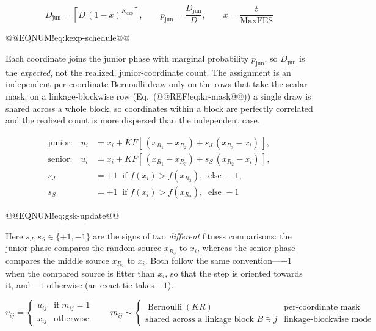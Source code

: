 \documentclass[10pt,a4paper]{article}
\begin{document}
\[
D_{\text{jun}} = \left\lceil D\,(1-x)^{K_{\exp}} \right\rceil,
\qquad p_{\text{jun}} = \frac{D_{\text{jun}}}{D},
\qquad x = \frac{t}{\text{MaxFES}}
\]

@@EQNUM!eq:kexp-schedule@@

Each coordinate joins the junior phase with marginal probability $p_{\text{jun}}$, so $D_{\text{jun}}$ is the \emph{expected}, not the realized, junior-coordinate count. The assignment is an independent per-coordinate Bernoulli draw only on the rows that take the scalar mask; on a linkage-blockwise row (Eq.~(@@REF!eq:kr-mask@@)) a single draw is shared across a whole block, so coordinates within a block are perfectly correlated and the realized count is more dispersed than the independent case.













\[
\begin{aligned}
\text{junior:}\quad u_i &= x_i + KF\left[\, (x_{R_1} - x_{R_2}) + s_J\,(x_{R_3} - x_i) \,\right],\\[2pt]
\text{senior:}\quad u_i &= x_i + KF\left[\, (x_{R_1} - x_{R_3}) + s_S\,(x_{R_2} - x_i) \,\right],\\[4pt]
s_J &= +1 \ \text{ if } f(x_i) > f(x_{R_3}), \ \text{ else } -1,\\[2pt]
s_S &= +1 \ \text{ if } f(x_i) > f(x_{R_2}), \ \text{ else } -1
\end{aligned}
\]

@@EQNUM!eq:gsk-update@@


Here $s_J,s_S\in\{+1,-1\}$ are the signs of two \emph{different} fitness
comparisons: the junior phase compares the random source $x_{R_3}$ to $x_i$,
whereas the senior phase compares the middle source $x_{R_2}$ to $x_i$.
Both follow the same convention---$+1$ when the compared source is fitter
than $x_i$, so that the step is oriented towards it, and $-1$ otherwise
(an exact tie takes $-1$).








\[
v_{ij} =
\begin{cases}
u_{ij} & \text{if } m_{ij} = 1\\[2pt]
x_{ij} & \text{otherwise}
\end{cases}
\qquad
m_{ij} \sim
\begin{cases}
\operatorname{Bernoulli}(KR) & \text{per-coordinate mask}\\[2pt]
\text{shared across a linkage block } B\ni j & \text{linkage-blockwise mode}
\end{cases}
\]
\end{document}
